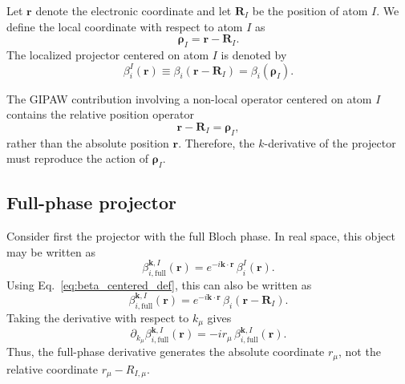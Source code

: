 \documentclass[11pt]{article}
\begin{document}
Let $\mathbf r$ denote the electronic coordinate and let $\mathbf R_I$
be the position of atom $I$. We define the local coordinate with respect
to atom $I$ as
\begin{equation}
\boldsymbol{\rho}_I = \mathbf r - \mathbf R_I .
\label{eq:rho_def_app}
\end{equation}
The localized projector centered on atom $I$ is denoted by
\begin{equation}
\beta_i^I(\mathbf r) \equiv \beta_i(\mathbf r-\mathbf R_I)
= \beta_i(\boldsymbol{\rho}_I) .
\label{eq:beta_centered_def}
\end{equation}

The GIPAW contribution involving a non-local operator centered on atom
$I$ contains the relative position operator
\begin{equation}
\mathbf r - \mathbf R_I = \boldsymbol{\rho}_I ,
\end{equation}
rather than the absolute position $\mathbf r$. Therefore, the
$k$-derivative of the projector must reproduce the action of
$\boldsymbol{\rho}_I$.

\subsection{Full-phase projector}

Consider first the projector with the full Bloch phase. In real space,
this object may be written as
\begin{equation}
\beta_{i,\mathrm{full}}^{\mathbf k,I}(\mathbf r)
=
e^{-i\mathbf k\cdot\mathbf r}\,
\beta_i^I(\mathbf r) .
\label{eq:beta_full_real}
\end{equation}
Using Eq.~\eqref{eq:beta_centered_def}, this can also be written as
\begin{equation}
\beta_{i,\mathrm{full}}^{\mathbf k,I}(\mathbf r)
=
e^{-i\mathbf k\cdot\mathbf r}\,
\beta_i(\mathbf r-\mathbf R_I) .
\end{equation}
Taking the derivative with respect to $k_\mu$ gives
\begin{equation}
\partial_{k_\mu}
\beta_{i,\mathrm{full}}^{\mathbf k,I}(\mathbf r)
=
-i r_\mu\,
\beta_{i,\mathrm{full}}^{\mathbf k,I}(\mathbf r) .
\label{eq:full_der_real}
\end{equation}
Thus, the full-phase derivative generates the absolute coordinate
$r_\mu$, not the relative coordinate $r_\mu-R_{I,\mu}$.
\end{document}
